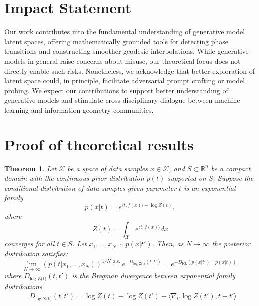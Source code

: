 \documentclass{article}
\theoremstyle{plain}
\newtheorem{theorem}{Theorem}[section]
\theoremstyle{definition}
\theoremstyle{remark}
\begin{document}
\section*{Impact Statement}

Our work contributes into the fundamental understanding of generative model latent spaces, offering mathematically grounded tools for detecting phase transitions and constructing smoother geodesic interpolations. While generative models in general raise concerns about misuse, our theoretical focus does not directly enable such risks. Nonetheless, we acknowledge that better exploration of latent space could, in principle, facilitate adversarial prompt crafting or model probing.  We expect our contributions to support better understanding of generative models and stimulate cross-disciplinary dialogue between machine learning and information geometry communities.





\newpage
\appendix
\onecolumn
\section{Proof of theoretical results}

\begin{theorem}
Let $ \mathcal{X} $ be a space of data samples $ x \in \mathcal{X} $, and $ S \subset \mathbb{R}^n $ be a compact domain with the continuous prior distribution $p(t)$ supported on $S$.
Suppose the conditional distribution of data samples given parameter $t$ is an exponential family
\begin{equation}
p(x|t) = e^{\langle t, f(x) \rangle - \log Z(t)},
\end{equation}
where 
\begin{equation}
Z(t) = \int_{\mathcal{X}} e^{\langle t, f(x) \rangle} dx
\end{equation}
converges for all $ t \in S $. Let $ x_1, \ldots, x_N \sim p(x|t') $. Then, as $N\to\infty$ the posterior distribution satisfies:
\begin{equation}
 \lim_{N \to \infty} \left(p(t|x_1, \ldots, x_N)\right)^{1/N} \overset{\text{a.s.}}{=} e^{-D_\text{log Z(t)}(t, t')} = e^{-D_\text{KL}(p(x|t') \| p(x|t))}.
\end{equation}
where $D_\text{log Z(t)}(t, t')$ is the Bregman divergence between exponential family distributions
\begin{equation}
    \begin{split}
        &D_\text{log Z(t)}(t, t') = \log Z(t) - \log Z(t') - \langle \nabla_{t'} \log Z(t'), t - t'  \rangle
    \end{split}
\end{equation}
\end{theorem}
\end{document}
